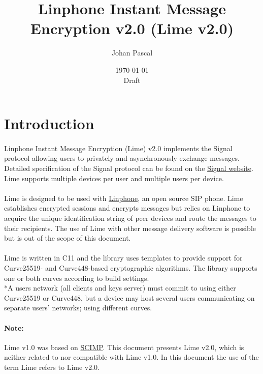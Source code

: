 \documentclass[a4paper,11pt]{article}
\title{Linphone Instant Message Encryption v2.0 (Lime v2.0)}
\date{\today\\Draft}
\author{Johan Pascal}
\begin{document}
\maketitle
\tableofcontents
\newpage

\section{Introduction}
\paragraph{}Linphone Instant Message Encryption (Lime) v2.0 implements the Signal protocol allowing users to privately and asynchronously exchange messages. Detailed specification of the Signal protocol can be found on the \href{https://signal.org/docs/}{Signal website}. Lime supports multiple devices per user and multiple users per device.
\paragraph{}Lime is designed to be used with \href{https://linphone.org}{Linphone}, an open source SIP phone. Lime establishes encrypted sessions and encrypts messages but relies on Linphone to acquire the unique identification string of peer devices and route the messages to their recipients. The use of Lime with other message delivery software is possible but is out of the scope of this document.
\paragraph*{}Lime is written in C\nolinebreak\hspace{-.05em}\raisebox{.4ex}{\tiny\bf +}\nolinebreak\hspace{-.10em}\raisebox{.4ex}{\tiny\bf +}11 and the library uses templates to provide support for Curve25519- and Curve448-based cryptographic algorithms. The library supports one or both curves according to build settings.\\*A users network (all clients and keys server) must commit to using either Curve25519 or Curve448, but a device may host several users communicating on separate users' networks; using different curves.
\paragraph{Note:} Lime v1.0 was based on \href{https://en.wikipedia.org/wiki/Silent_Circle_Instant_Messaging_Protocol}{SCIMP}. This document presents Lime v2.0, which is neither related to nor compatible with Lime v1.0. In this document the use of the term Lime refers to Lime v2.0.
\end{document}
